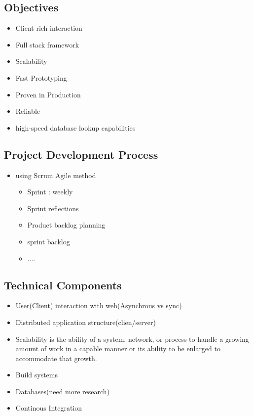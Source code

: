 
\subsection{Objectives}
\begin{itemize}
	\item Client rich interaction
	\item Full stack framework
	\item Scalability
	\item Fast Prototyping
	\item Proven in Production
	\item Reliable
	\item high-speed database lookup capabilities
\end{itemize}
\subsection{Project Development Process} %
\begin{itemize}
	\item using Scrum Agile method
	\begin{itemize}
		\item Sprint : weekly
		\item Sprint reflections
		\item Product backlog planning
		\item sprint backlog
		\item ....
	\end{itemize}
\end{itemize}
\subsection{Technical Components}
\begin{itemize}
	\item User(Client) interaction with web(Asynchrous vs sync)
	\item Distributed application structure(clien/server)
	\item Scalability is the ability of a system, network, or process to handle a growing amount of work in a capable manner or its ability to be enlarged to accommodate that growth.
	\item Build systems
	\item Databases(need more research)
	\item Continous Integration
\end{itemize}
